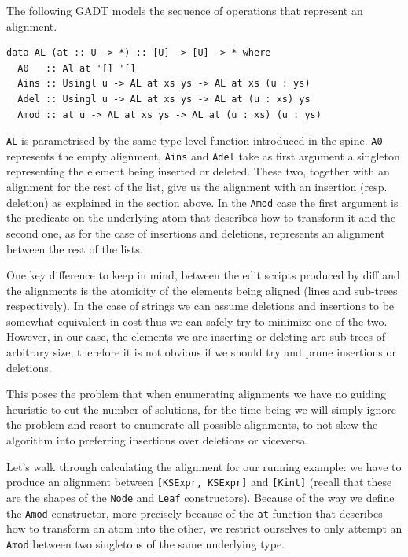 \documentclass[11pt, titlepage]{article}
\begin{document}
The following GADT models the sequence of operations that represent an 
alignment.

\begin{verbatim}
data AL (at :: U -> *) :: [U] -> [U] -> * where
  A0   :: Al at '[] '[]
  Ains :: Usingl u -> AL at xs ys -> AL at xs (u : ys)
  Adel :: Usingl u -> AL at xs ys -> AL at (u : xs) ys
  Amod :: at u -> AL at xs ys -> AL at (u : xs) (u : ys)
\end{verbatim}

\texttt{AL} is parametrised by the same type-level function introduced in the spine. 
\texttt{A0} represents the empty alignment, \texttt{Ains} and \texttt{Adel} take as first argument
a singleton representing the element being inserted or deleted. These two, together
with an alignment for the rest of the list, give us the alignment with
an insertion (resp. deletion) as explained in the section above. In the
\texttt{Amod} case the first argument is the predicate on the underlying atom that describes how to transform 
it and the second one, as for the case of insertions and deletions, represents an  
alignment between the rest of the lists. 

One key difference to keep in mind, between the edit scripts produced by diff and the alignments is the atomicity of the elements being aligned (lines and sub-trees respectively). In the
case of strings we can assume deletions and insertions to be somewhat
equivalent in cost thus we can safely try to minimize one of the two.
However, in our case, the elements we are inserting or deleting are
sub-trees of arbitrary size, therefore it is not obvious if we should try and prune
insertions or deletions.

This poses the problem that when enumerating alignments we have no guiding heuristic to cut the number
of solutions, for the time being we will simply ignore the problem and resort to enumerate
all possible alignments, to not skew the algorithm into preferring
insertions over deletions or viceversa.

Let's walk through calculating the alignment for our running example: we have to 
produce an alignment between \texttt{[KSExpr, KSExpr]} and \texttt{[Kint]} (recall that these are the shapes of the 
\texttt{Node} and \texttt{Leaf} constructors). Because of the way we 
define the \texttt{Amod} constructor, more precisely because of the \texttt{at} 
function that describes how to transform an atom into the other, we restrict 
ourselves to only attempt an \texttt{Amod} between two singletons of the same underlying type. 
\end{document}
